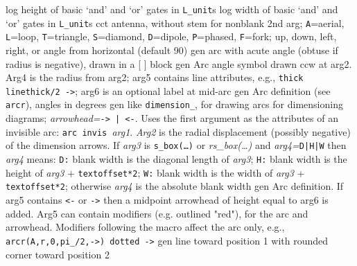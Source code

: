   {log}
  {height of basic `and' and `or' gates in {\tt L\_unit}s}
  {log}
  {width of basic `and' and `or' gates in {\tt L\_unit}s}
  {cct}
  {antenna, without stem for nonblank 2nd arg; {\tt A}=aerial,
    {\tt L}=loop, {\tt T}=triangle, {\tt S}=diamond, {\tt D}=dipole,
    {\tt P}=phased, {\tt F}=fork;
    up, down, left, right, or angle from horizontal (default 90) 
   }
  {gen}
  {arc with acute angle (obtuse if radius is negative), drawn in a [ ] block}
  {gen}
  {Arc angle symbol drawn ccw at arg2. Arg4 is the radius from arg2;
     arg5 contains line attributes, e.g., {\tt thick linethick/2 ->};
     arg6 is an optional label at mid-arc}
  {gen}
  {Arc definition (see {\tt arcr}), angles in degrees
    }
  {gen}
  {like {\tt dimension\_}, for drawing arcs for dimensioning diagrams;
      {\sl arrowhead=}{\tt -> | <-}. Uses the first argument as the attributes
      of an invisible arc: {\tt arc invis }{\sl arg1}.  {\sl Arg2} is the
      radial displacement (possibly negative) of the dimension arrows.
      If {\sl arg3} is {\tt s\_box(\ldots)} or {\sl rs\_box(\ldots)} and
      {\sl arg4=}{\tt D|H|W} then {\sl arg4} means:
      {\tt D:} blank width is the diagonal length of {\sl arg3};
      {\tt H:} blank width is the height of {\sl arg3} + {\tt textoffset*2};
      {\tt W:} blank width is the width of {\sl arg3} + {\tt textoffset*2};
      otherwise {\sl arg4} is the absolute blank width}
  {gen}
  {Arc definition.  If arg5 contains {\tt <-} or {\tt ->} then a midpoint
    arrowhead of height equal to arg6 is added. Arg5 can contain modifiers
    (e.g. outlined "red"), for the arc and arrowhead.  Modifiers following
    the macro affect the arc only,
    e.g., {\tt arcr(A,r,0,pi\_/2,->) dotted ->}
   }
  {gen}
  {line toward position 1 with rounded corner toward position 2}
